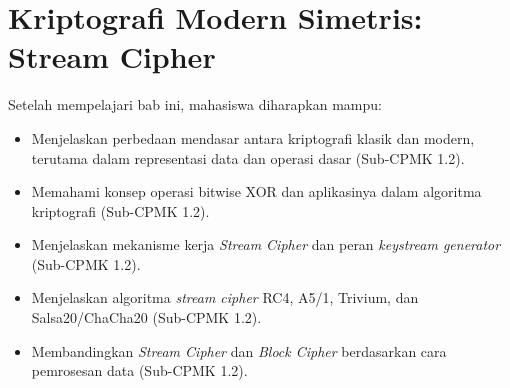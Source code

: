\documentclass[../../main.tex]{subfiles}
\begin{document}
\chapter{Kriptografi Modern Simetris: Stream Cipher}
\label{chap:stream-cipher}

\begin{learningoutcome}
Setelah mempelajari bab ini, mahasiswa diharapkan mampu:
\begin{itemize}
    \item Menjelaskan perbedaan mendasar antara kriptografi klasik dan modern, terutama dalam representasi data dan operasi dasar (Sub-CPMK 1.2).
    \item Memahami konsep operasi bitwise XOR dan aplikasinya dalam algoritma kriptografi (Sub-CPMK 1.2).
    \item Menjelaskan mekanisme kerja \textit{Stream Cipher} dan peran \textit{keystream generator} (Sub-CPMK 1.2).
    \item Menjelaskan algoritma \textit{stream cipher} RC4, A5/1, Trivium, dan Salsa20/ChaCha20 (Sub-CPMK 1.2).
    \item Membandingkan \textit{Stream Cipher} dan \textit{Block Cipher} berdasarkan cara pemrosesan data (Sub-CPMK 1.2).
\end{itemize}
\end{learningoutcome}









\end{document}
